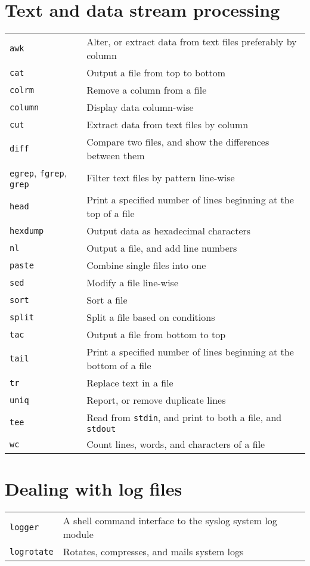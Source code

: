 \documentclass[10pt]{article}
\begin{document}
\begin{multicols}{2}
\section{Text and data stream processing}
\begin{tabular}{ p{2.5cm} p{8.5cm} }
  \hline
  \texttt{awk} & Alter, or extract data from text files preferably by column\\
  \rowcolor{Gray}
  \texttt{cat} & Output a file from top to bottom \\
  \texttt{colrm} & Remove a column from a file \\
  \rowcolor{Gray}
  \texttt{column} & Display data column-wise \\
  \texttt{cut} & Extract data from text files by column \\
  \rowcolor{Gray}
  \texttt{diff} & Compare two files, and show the differences between them\\
  \texttt{egrep}, \texttt{fgrep}, \texttt{grep} & Filter text files by pattern line-wise \\
  \rowcolor{Gray}
  \texttt{head} & Print a specified number of lines beginning at  the top of a file\\
  \texttt{hexdump} & Output data as hexadecimal characters\\
  \rowcolor{Gray}
  \texttt{nl} & Output a file, and add line numbers\\
  \texttt{paste} & Combine single files into one \\
  \rowcolor{Gray}
  \texttt{sed} & Modify a file line-wise \\
  \texttt{sort} & Sort a file \\
  \rowcolor{Gray}
  \texttt{split} & Split a file based on conditions\\
  \texttt{tac} & Output a file from bottom to top\\
  \rowcolor{Gray}
  \texttt{tail} & Print a specified number of lines beginning at the bottom of a file\\
  \texttt{tr} & Replace text in a file\\
  \rowcolor{Gray}
  \texttt{uniq} & Report, or remove duplicate lines \\
  \texttt{tee} & Read from \texttt{stdin}, and print to both a file, and \texttt{stdout}\\
  \rowcolor{Gray}
  \texttt{wc} & Count lines, words, and characters of a file\\
  \hline
\end{tabular}

\section{Dealing with log files}
\begin{tabular}{ p{2.5cm} p{8.5cm} }
  \hline
  \texttt{logger} & A shell command interface to the syslog system log module \\
  \rowcolor{Gray}
  \texttt{logrotate} & Rotates, compresses, and mails system logs \\
  \hline
\end{tabular}

\end{multicols}
\end{document}
